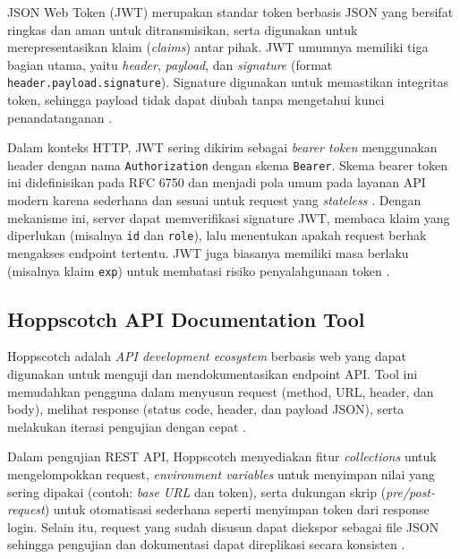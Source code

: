 \documentclass[a4paper,oneside,11pt]{book}
\begin{document}
\par JSON Web Token (JWT) merupakan standar token berbasis JSON yang bersifat ringkas dan aman untuk ditransmisikan, serta digunakan untuk merepresentasikan klaim (\textit{claims}) antar pihak. JWT umumnya memiliki tiga bagian utama, yaitu \textit{header}, \textit{payload}, dan \textit{signature} (format \texttt{header.payload.signature}). Signature digunakan untuk memastikan integritas token, sehingga payload tidak dapat diubah tanpa mengetahui kunci penandatanganan \cite{rfc7519-jwt}.

\par Dalam konteks HTTP, JWT sering dikirim sebagai \textit{bearer token} menggunakan header dengan nama \texttt{Authorization} dengan skema \texttt{Bearer}. Skema bearer token ini didefinisikan pada RFC 6750 dan menjadi pola umum pada layanan API modern karena sederhana dan sesuai untuk request yang \textit{stateless} \cite{rfc6750-bearer}. Dengan mekanisme ini, server dapat memverifikasi signature JWT, membaca klaim yang diperlukan (misalnya \texttt{id} dan \texttt{role}), lalu menentukan apakah request berhak mengakses endpoint tertentu. JWT juga biasanya memiliki masa berlaku (misalnya klaim \texttt{exp}) untuk membatasi risiko penyalahgunaan token \cite{rfc7519-jwt}.

\subsection{Hoppscotch API Documentation Tool}

\par Hoppscotch adalah \textit{API development ecosystem} berbasis web yang dapat digunakan untuk menguji dan mendokumentasikan endpoint API. Tool ini memudahkan pengguna dalam menyusun request (method, URL, header, dan body), melihat response (status code, header, dan payload JSON), serta melakukan iterasi pengujian dengan cepat \cite{hoppscotch-docs}.

\par Dalam pengujian REST API, Hoppscotch menyediakan fitur \textit{collections} untuk mengelompokkan request, \textit{environment variables} untuk menyimpan nilai yang sering dipakai (contoh: \textit{base URL} dan token), serta dukungan skrip (\textit{pre/post-request}) untuk otomatisasi sederhana seperti menyimpan token dari response login. Selain itu, request yang sudah disusun dapat diekspor sebagai file JSON sehingga pengujian dan dokumentasi dapat direplikasi secara konsisten \cite{hoppscotch-docs,hoppscotch-github}.
\end{document}
